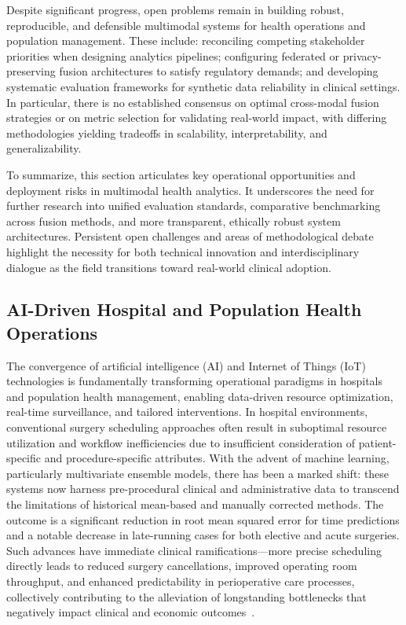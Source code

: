 \documentclass[sigconf]{acmart}
\begin{document}
Despite significant progress, open problems remain in building robust, reproducible, and defensible multimodal systems for health operations and population management. These include: reconciling competing stakeholder priorities when designing analytics pipelines; configuring federated or privacy-preserving fusion architectures to satisfy regulatory demands; and developing systematic evaluation frameworks for synthetic data reliability in clinical settings. In particular, there is no established consensus on optimal cross-modal fusion strategies or on metric selection for validating real-world impact, with differing methodologies yielding tradeoffs in scalability, interpretability, and generalizability.

To summarize, this section articulates key operational opportunities and deployment risks in multimodal health analytics. It underscores the need for further research into unified evaluation standards, comparative benchmarking across fusion methods, and more transparent, ethically robust system architectures. Persistent open challenges and areas of methodological debate highlight the necessity for both technical innovation and interdisciplinary dialogue as the field transitions toward real-world clinical adoption.

\subsection{AI-Driven Hospital and Population Health Operations}

The convergence of artificial intelligence (AI) and Internet of Things (IoT) technologies is fundamentally transforming operational paradigms in hospitals and population health management, enabling data-driven resource optimization, real-time surveillance, and tailored interventions. In hospital environments, conventional surgery scheduling approaches often result in suboptimal resource utilization and workflow inefficiencies due to insufficient consideration of patient-specific and procedure-specific attributes. With the advent of machine learning, particularly multivariate ensemble models, there has been a marked shift: these systems now harness pre-procedural clinical and administrative data to transcend the limitations of historical mean-based and manually corrected methods. The outcome is a significant reduction in root mean squared error for time predictions and a notable decrease in late-running cases for both elective and acute surgeries. Such advances have immediate clinical ramifications—more precise scheduling directly leads to reduced surgery cancellations, improved operating room throughput, and enhanced predictability in perioperative care processes, collectively contributing to the alleviation of longstanding bottlenecks that negatively impact clinical and economic outcomes~\cite{ref81}.
\end{document}
